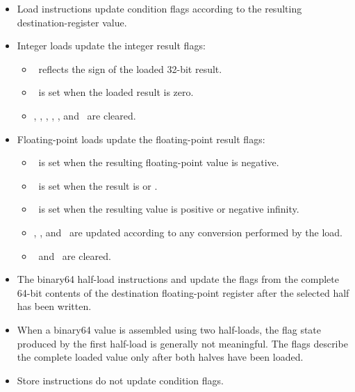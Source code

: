 \begin{itemize}
\item Load instructions update condition flags according to the resulting
destination-register value.

\item Integer loads update the integer result flags:
\begin{itemize}
\item \flagN\ reflects the sign of the loaded 32-bit result.
\item \flagZ\ is set when the loaded result is zero.
\item \flagC, \flagV, \flagE, \flagI, \flagU, and \flagX\ are cleared.
\end{itemize}

\item Floating-point loads update the floating-point result flags:
\begin{itemize}
\item \flagN\ is set when the resulting floating-point value is negative.
\item \flagZ\ is set when the result is  or .
\item \flagI\ is set when the resulting value is positive or negative
infinity.
\item \flagU, \flagX, and \flagE\ are updated according to any conversion
performed by the load.
\item \flagC\ and \flagV\ are cleared.
\end{itemize}

\item The binary64 half-load instructions  and  update the
flags from the complete 64-bit contents of the destination floating-point
register after the selected half has been written.

\item When a binary64 value is assembled using two half-loads, the flag state
produced by the first half-load is generally not meaningful. The flags
describe the complete loaded value only after both halves have been
loaded.

\item Store instructions do not update condition flags.
\end{itemize}

\subsection{}

